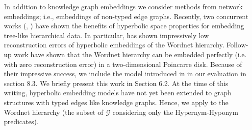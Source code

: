 In addition to knowledge graph embeddings we consider methods from network embeddings; i.e., embeddings of non-typed edge graphs. Recently, two concurrent works (\cite{chamberlainneural}, \cite{nickel2017poincare}) have shown the benefits of hyperbolic space properties for embedding tree-like hierarchical data. In particular, \cite{nickel2017poincare} has shown impressively low reconstruction errors of hyperbolic embeddings of the Wordnet hierarchy. Follow-up work \cite{de2018representation} have shown that the Wordnet hierarchy can be embedded perfectly (i.e. with zero reconstruction error) in a two-dimensional Poincarre disk. Because of their impressive success, we include the model introduced in \cite{nickel2017poincare} in our evaluation in section 8.3. We briefly present this work in Section 6.2. At the time of this writing, hyperbolic embedding models have not yet been extended to graph structures with typed edges like knowledge graphs. Hence, we apply \cite{nickel2017poincare} to the Wordnet hierarchy (the subset of $\mathcal{G}$ considering only the Hypernym-Hyponym predicates).

